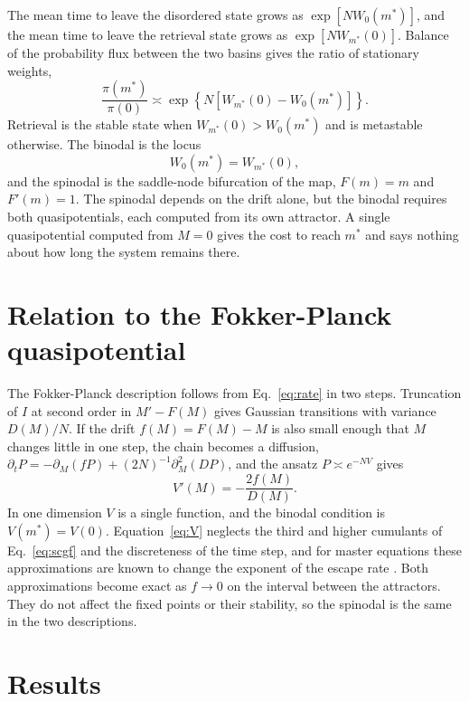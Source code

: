 \documentclass[aps,pre,twocolumn,superscriptaddress,floatfix]{revtex4-2}
\begin{document}
The mean time to leave the disordered state grows as $\exp[N W_0(m^*)]$, and the mean time to leave the retrieval state grows as $\exp[N W_{m^*}(0)]$. Balance of the probability flux between the two basins gives the ratio of stationary weights,
\begin{equation}
\frac{\pi(m^*)}{\pi(0)}\asymp\exp\left\{N\left[W_{m^*}(0)-W_0(m^*)\right]\right\}.
\label{eq:ratio}
\end{equation}
Retrieval is the stable state when $W_{m^*}(0)>W_0(m^*)$ and is metastable otherwise. The binodal is the locus
\begin{equation}
W_0(m^*)=W_{m^*}(0),
\label{eq:binodal}
\end{equation}
and the spinodal is the saddle-node bifurcation of the map, $F(m)=m$ and $F'(m)=1$. The spinodal depends on the drift alone, but the binodal requires both quasipotentials, each computed from its own attractor. A single quasipotential computed from $M=0$ gives the cost to reach $m^*$ and says nothing about how long the system remains there.

\section{Relation to the Fokker-Planck quasipotential}

The Fokker-Planck description follows from Eq.~\eqref{eq:rate} in two steps. Truncation of $I$ at second order in $M'-F(M)$ gives Gaussian transitions with variance $D(M)/N$. If the drift $f(M)=F(M)-M$ is also small enough that $M$ changes little in one step, the chain becomes a diffusion, $\partial_tP=-\partial_M(fP)+(2N)^{-1}\partial_M^2(DP)$, and the ansatz $P\asymp e^{-NV}$ gives
\begin{equation}
V'(M)=-\frac{2f(M)}{D(M)}.
\label{eq:V}
\end{equation}
In one dimension $V$ is a single function, and the binodal condition is $V(m^*)=V(0)$. Equation~\eqref{eq:V} neglects the third and higher cumulants of Eq.~\eqref{eq:scgf} and the discreteness of the time step, and for master equations these approximations are known to change the exponent of the escape rate \cite{HanggiGrabert1984}. Both approximations become exact as $f\to0$ on the interval between the attractors. They do not affect the fixed points or their stability, so the spinodal is the same in the two descriptions.

\section{Results}
\end{document}
